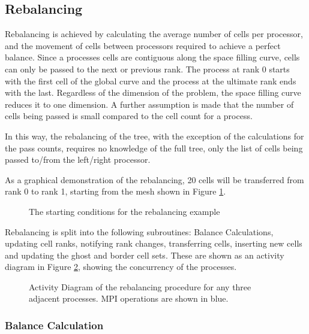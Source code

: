 \documentclass{IIBproject}
\numberwithin{figure}{section}
\begin{document}


    \subsection{Rebalancing} %
        \label{sec:rebalancing}

        Rebalancing is achieved by calculating the average number of cells per processor, and the movement of cells between processors required to achieve a perfect balance. Since a processes cells are contiguous along the space filling curve, cells can only be passed to the next or previous rank. The process at rank 0 starts with the first cell of the global curve and the process at the ultimate rank ends with the last. Regardless of the dimension of the problem, the space filling curve reduces it to one dimension. A further assumption is made that the number of cells being passed is small compared to the cell count for a process.

        In this way, the rebalancing of the tree, with the exception of the calculations for the pass counts, requires no knowledge of the full tree, only the list of cells being passed to/from the left/right processor.

        As a graphical demonstration of the rebalancing, 20 cells will be transferred from rank 0 to rank 1, starting from the mesh shown in Figure \ref{fig:rebalance-init}.

        \begin{figure}[H]
            
            \caption{The starting conditions for the rebalancing example}
            \label{fig:rebalance-init}
        \end{figure}

        Rebalancing is split into the following subroutines: Balance Calculations, updating cell ranks, notifying rank changes, transferring cells, inserting new cells and updating the ghost and border cell sets. These are shown as an activity diagram in Figure \ref{fig:rebalance-overview}, showing the concurrency of the processes.

        \begin{figure}[H]
            
            \caption{Activity Diagram of the rebalancing procedure for any three adjacent processes. MPI operations are shown in blue.}
            \label{fig:rebalance-overview}
        \end{figure}


        \subsubsection{Balance Calculation} %
            \label{sec:rebalancing-calc}
\end{document}
